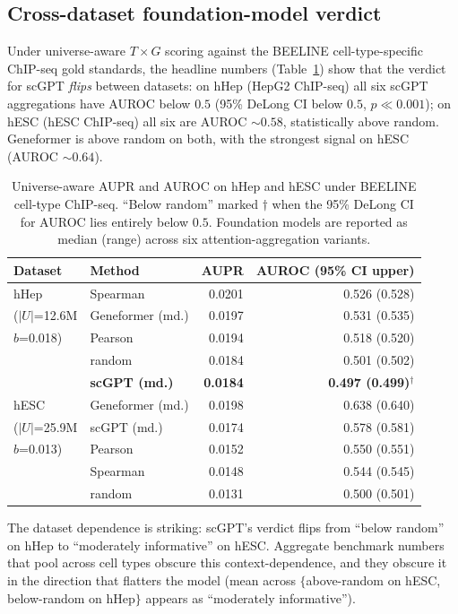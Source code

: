 \documentclass[sigconf]{acmart}
\begin{document}
\subsection{Cross-dataset foundation-model verdict}
\label{sec:univ_aware_results}

Under universe-aware $T \times G$ scoring against the BEELINE
cell-type-specific ChIP-seq gold standards, the headline numbers
(Table~\ref{tab:headline}) show that the verdict for scGPT
\emph{flips} between datasets: on hHep (HepG2 ChIP-seq) all six scGPT
aggregations have AUROC below $0.5$ (95\% DeLong CI below $0.5$,
$p \ll 0.001$); on hESC (hESC ChIP-seq) all six are AUROC
$\sim 0.58$, statistically above random. Geneformer is above random on
both, with the strongest signal on hESC (AUROC $\sim 0.64$).

\begin{table}[t]
\caption{Universe-aware AUPR and AUROC on hHep and hESC under
BEELINE cell-type ChIP-seq. ``Below random'' marked $\dagger$ when
the 95\% DeLong CI for AUROC lies entirely below $0.5$. Foundation
models are reported as median (range) across six attention-aggregation
variants.}
\label{tab:headline}
\small
\begin{tabular}{llrr}
\toprule
Dataset & Method & AUPR & AUROC (95\% CI upper) \\
\midrule
hHep & Spearman          & 0.0201 & 0.526 (0.528) \\
($|U|$=12.6M  & Geneformer (md.)  & 0.0197 & 0.531 (0.535) \\
$b$=0.018)    & Pearson           & 0.0194 & 0.518 (0.520) \\
              & random            & 0.0184 & 0.501 (0.502) \\
              & \textbf{scGPT (md.)} & \textbf{0.0184} & \textbf{0.497 (0.499)}$^\dagger$ \\
\midrule
hESC & Geneformer (md.)  & 0.0198 & 0.638 (0.640) \\
($|U|$=25.9M  & scGPT (md.)       & 0.0174 & 0.578 (0.581) \\
$b$=0.013)    & Pearson           & 0.0152 & 0.550 (0.551) \\
              & Spearman          & 0.0148 & 0.544 (0.545) \\
              & random            & 0.0131 & 0.500 (0.501) \\
\bottomrule
\end{tabular}
\end{table}

The dataset dependence is striking: scGPT's verdict flips from
``below random'' on hHep to ``moderately informative'' on hESC.
Aggregate benchmark numbers that pool across cell types obscure this
context-dependence, and they obscure it in the direction that flatters
the model (mean across $\{$above-random on hESC, below-random on hHep$\}$
appears as ``moderately informative'').
\end{document}
